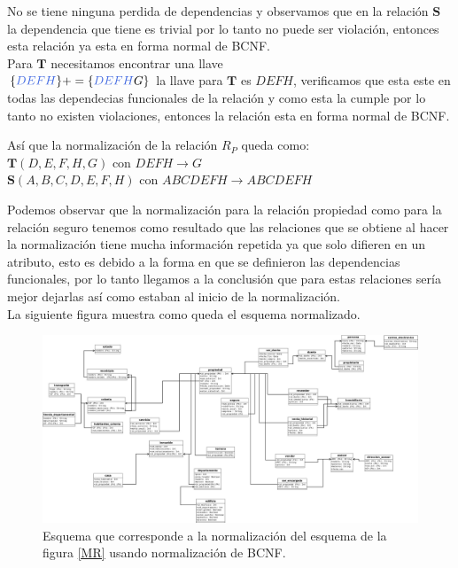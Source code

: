 \documentclass[10pt]{article}
\begin{document}
\begin{enumerate}
\begin{itemize}
    		No se tiene ninguna perdida de dependencias y observamos que en la relación
    		$\textbf{S}$ la dependencia que tiene es trivial por lo tanto no puede ser violación, entonces esta relación ya esta en forma normal de BCNF. \\
    		Para $\textbf{T}$  necesitamos encontrar una llave\\
    		$\{\textcolor{RoyalBlue}{DEFH}\}+= \{\textcolor{RoyalBlue}{DEFH}G\}$ la llave para $\textbf{T}$ es $DEFH$, verificamos que esta este en todas las dependecias funcionales de la relación y como esta la cumple por lo tanto no existen violaciones, entonces la relación esta en forma normal de BCNF.\\
    	\end{itemize}
    	Así que la normalización de la relación $R_P$ queda como:\\
    	
    	$\textbf{T}(D,E,F,H,G)$ con $DEFH \rightarrow G$\\
    	$\textbf{S}(A,B,C,D,E,F,H)$ con $ABCDEFH \rightarrow ABCDEFH$\\ 
    	
     
    \end{enumerate}
	
Podemos observar que la normalización para la relación propiedad como para la relación seguro tenemos como resultado que las relaciones que se obtiene al hacer la normalización tiene mucha información repetida ya que solo difieren en un atributo, esto es debido a la forma en que se definieron las dependencias funcionales, por lo tanto llegamos a la conclusión que para estas relaciones sería mejor dejarlas así como estaban al inicio de la normalización.\\

La siguiente figura muestra como queda el esquema normalizado.\\
    
    \begin{center}
    	\begin{figure}[H]
    		\centering
    		\includegraphics[width=1 \textwidth]{./modeloNormalizadoF.jpeg}
    		\caption{Esquema que corresponde a la normalización del esquema de la figura \ref{MR} usando normalización de BCNF.}
    	\end{figure}
    \end{center}
    
\end{document}
